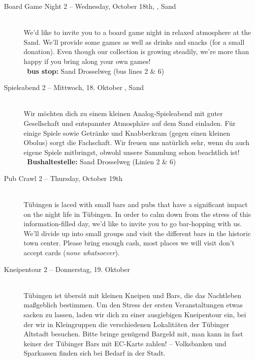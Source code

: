 \begin{description}
\ifml
	\item[Board Game Night 2 -- Wednesday, October 18th, \YEAR, Sand]~\\%
	We'd like to invite you to a board game night in relaxed atmosphere at the Sand.
    We'll provide some games as well as drinks and snacks (for a small donation).
    Even though our collection is growing steadily, we're more than happy if you bring along your own games!\\
	~\textbf{bus stop:} Sand Drosselweg (bus lines 2 \& 6)
\else
    \item[Spieleabend 2 -- Mittwoch, 18. Oktober \YEAR, Sand]~\\%
	Wir möchten dich zu einem kleinen Analog-Spieleabend mit guter Gesellschaft und entspannter Atmosphäre auf dem Sand einladen.
    Für einige Spiele sowie Getränke und Knabberkram (gegen einen kleinen Obolus) sorgt die Fachschaft.
    Wir freuen uns natürlich sehr, wenn du auch eigene Spiele mitbringst, obwohl unsere Sammlung schon beachtlich ist!\\
	~\textbf{Bushaltestelle:} Sand Drosselweg (Linien 2 \& 6)
\fi

\ifml
	\item[Pub Crawl 2 -- Thursday, October 19th \YEAR]~\\%
	Tübingen is laced with small bars and pubs that have a significant impact on the night life in Tübingen.
	In order to calm down from the stress of this information-filled day, we'd like to invite you to go bar-hopping with us.
	We'll divide up into small groups and visit the different bars in the historic town center.
	Please bring enough cash, most places we will visit don't accept cards (\emph{none whatsoever}).
\else
	\item[Kneipentour 2 -- Donnerstag, 19. Oktober \YEAR]~\\%
	Tübingen ist übersät mit kleinen Kneipen und Bars, die das Nachtleben maßgeblich bestimmen.
	Um den Stress der ersten Veranstaltungen etwas sacken zu lassen, laden wir dich zu einer ausgiebigen Kneipentour ein,
	bei der wir in Kleingruppen die verschiedenen Lokalitäten der Tübinger Altstadt besuchen.
	Bitte bringe genügend Bargeld mit, man kann in fast keiner der Tübinger Bars mit EC-Karte zahlen! -- Volksbanken und Sparkassen finden sich bei Bedarf in der Stadt.
\fi


\end{description}
